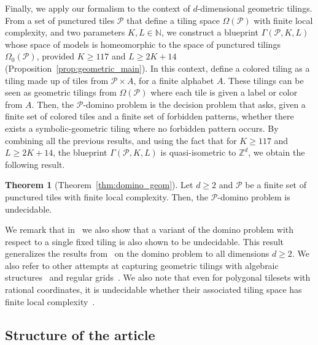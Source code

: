 \documentclass{article}
\theoremstyle{definition}
\theoremstyle{definition}
\newtheorem{thmx}{Theorem}
\newcommand{\N}{\mathbb{N}}
\newcommand{\Z}{\mathbb{Z}}
\newcommand{\PP}{\mathcal{P}}
\begin{document}
Finally, we apply our formalism to the context of $d$-dimensional geometric tilings. From a set of punctured tiles $\PP$ that define a tiling space $\Omega(\PP)$ with finite local complexity, and two parameters $K,L\in\N$, we construct a blueprint $\Gamma(\PP,K,L)$ whose space of models is homeomorphic to the space of punctured tilings $\Omega_0(\PP)$, provided $K\geq 117$ and $L\geq 2K+14$ (Proposition~\ref{prop:geometric_main}). In this context, define a colored tiling as a tiling made up of tiles from $\PP\times A$, for a finite alphabet $A$. These tilings can be seen as geometric tilings from $\Omega(\PP)$ where each tile is given a label or color from $A$. Then, the $\PP$-domino problem is the decision problem that asks, given a finite set of colored tiles and a finite set of forbidden patterns, whether there exists a symbolic-geometric tiling where no forbidden pattern occurs. By combining all the previous results, and using the fact that for $K\geq 117$ and $L\geq 2K+14$, the blueprint $\Gamma(\PP, K,L)$ is quasi-isometric to $\Z^d$, we obtain the following result.

\begin{thmx}[Theorem~\ref{thm:domino_geom}]
       Let $d\geq 2$ and $\PP$ be a finite set of punctured tiles with finite local complexity. Then, the $\PP$-domino problem is undecidable.
\end{thmx}

We remark that in~ we also show that a variant of the domino problem with respect to a single fixed tiling is also shown to be undecidable. This result generalizes the results from~\cite{hellouin2023domino,de2024decision} on the domino problem to all dimensions $d\geq 2$. We also refer to other attempts at capturing geometric tilings with algebraic structures~\cite{coulbois2024aperiodic} and regular grids~\cite{sadun2006tilings}. We also note that even for polygonal tilesets with rational coordinates, it is undecidable whether their associated tiling space has finite local complexity~\cite{de2024decision}.


\subsection*{Structure of the article}
\end{document}
